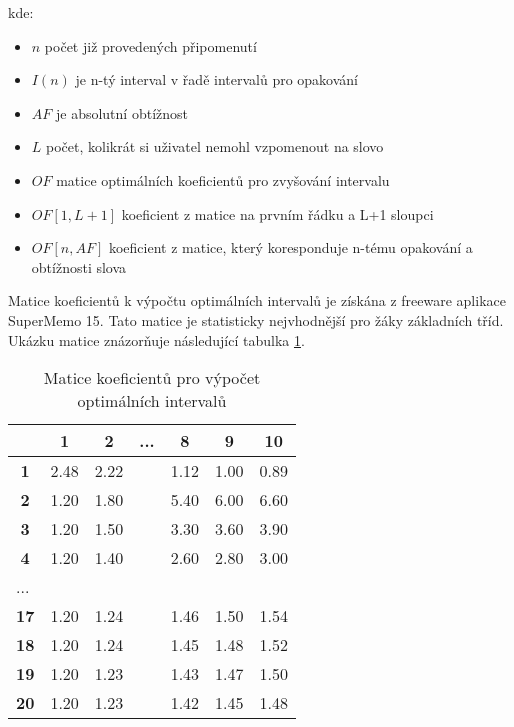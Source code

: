 \documentclass[a4paper,11pt,titlepage,fleqn]{article}
\begin{document}
            kde:
                \begin{itemize}
                    \item $n$ počet již provedených připomenutí
                    \item $I(n)$ je n-tý interval v řadě intervalů pro opakování
                    \item $AF$ je absolutní obtížnost
                    \item $L$ počet, kolikrát si uživatel nemohl vzpomenout na slovo
                    \item $OF$ matice optimálních koeficientů pro zvyšování intervalu
                    \item $OF[1,L+1]$ koeficient z matice na prvním řádku a L+1 sloupci
                    \item $OF[n,AF]$ koeficient z matice, který koresponduje n-tému opakování a obtížnosti slova
                \end{itemize} 

            Matice koeficientů k výpočtu optimálních intervalů je získána z freeware aplikace SuperMemo 15. Tato matice je statisticky nejvhodnější pro žáky základních tříd. Ukázku matice znázorňuje následující tabulka \ref{of-matrix}.

            \begin{table}[ht!]
                \centering
                \begin{tabular}{|c|c|c|l|c|c|c|}
                    \hline
                     & \textbf{1} & \textbf{2} & ... & \textbf{8} & \textbf{9} & \textbf{10} \\ \hline
                    \textbf{1} & 2.48 & 2.22 &  & 1.12 & 1.00 & 0.89 \\ \hline
                    \textbf{2} & 1.20 & 1.80 &  & 5.40 & 6.00 & 6.60 \\ \hline
                    \textbf{3} & 1.20 & 1.50 &  & 3.30 & 3.60 & 3.90 \\ \hline
                    \textbf{4} & 1.20 & 1.40 &  & 2.60 & 2.80 & 3.00 \\ \hline
                    \multicolumn{1}{|l|}{...} & \multicolumn{1}{l|}{} & \multicolumn{1}{l|}{} &  & \multicolumn{1}{l|}{} & \multicolumn{1}{l|}{} & \multicolumn{1}{l|}{} \\ \hline
                    \textbf{17} & 1.20 & 1.24 &  & 1.46 & 1.50 & 1.54 \\ \hline
                    \textbf{18} & 1.20 & 1.24 &  & 1.45 & 1.48 & 1.52 \\ \hline
                    \textbf{19} & 1.20 & 1.23 &  & 1.43 & 1.47 & 1.50 \\ \hline
                    \textbf{20} & 1.20 & 1.23 &  & 1.42 & 1.45 & 1.48 \\ \hline
                \end{tabular}
                \caption{Matice koeficientů pro výpočet optimálních intervalů}
                \label{of-matrix}
            \end{table}
\end{document}
